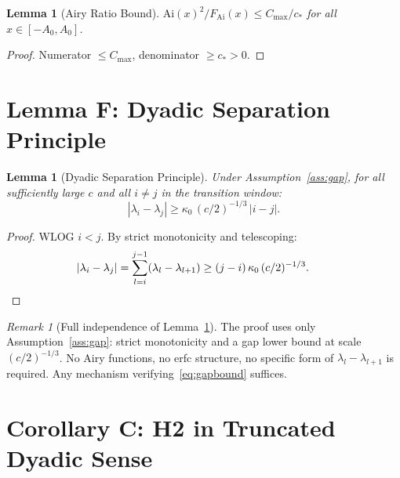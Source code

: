 \documentclass[12pt]{amsart}
\newtheorem{lemma}[theorem]{Lemma}
\theoremstyle{definition}
\theoremstyle{remark}
\newtheorem{remark}[theorem]{Remark}
\newcommand{\FAi}{F_{\mathrm{Ai}}}
\begin{document}
\begin{lemma}[Airy Ratio Bound]
\label{lem:B}
$\mathrm{Ai}(x)^2/\FAi(x) \le C_{\max}/c_*$
for all $x \in [-A_0,A_0]$.
\end{lemma}

\begin{proof}
Numerator $\le C_{\max}$, denominator $\ge c_*>0$.
\end{proof}

\section{Lemma F: Dyadic Separation Principle}
\label{sec:lemmaF}

\begin{lemma}[Dyadic Separation Principle]
\label{lem:F}
Under Assumption~\ref{ass:gap},
for all sufficiently large $c$ and all $i \ne j$
in the transition window:
\begin{equation}\label{eq:specsep}
  |\lambda_i-\lambda_j|
  \ge \kappa_0\,(c/2)^{-1/3}\,|i-j|.
\end{equation}
\end{lemma}

\begin{proof}
WLOG $i < j$. By strict monotonicity and telescoping:
\[
  |\lambda_i - \lambda_j|
  = \sum_{l=i}^{j-1}(\lambda_l - \lambda_{l+1})
  \ge (j-i)\,\kappa_0\,(c/2)^{-1/3}.\qquad\qedhere
\]
\end{proof}

\begin{remark}[Full independence of Lemma~\ref{lem:F}]
\label{rem:Frobust}
The proof uses only Assumption~\ref{ass:gap}:
strict monotonicity and a gap lower bound at scale
$(c/2)^{-1/3}$.
No Airy functions, no erfc structure, no specific
form of $\lambda_l - \lambda_{l+1}$ is required.
Any mechanism verifying~\eqref{eq:gapbound} suffices.
\end{remark}

\section{Corollary C: H2 in Truncated Dyadic Sense}
\label{sec:H2}
\end{document}
